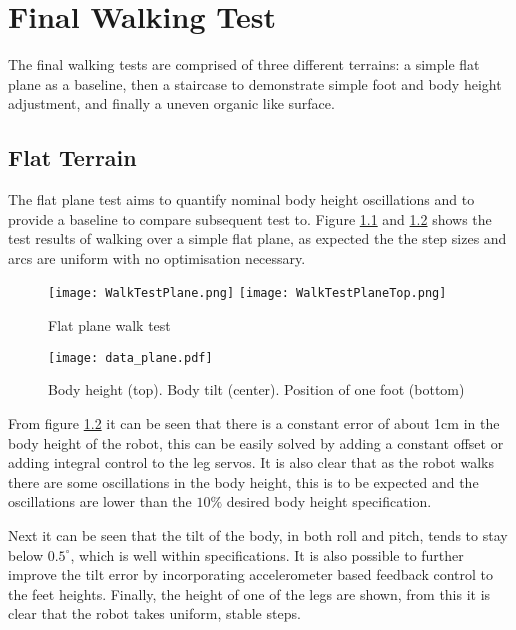 \chapter{Final Walking Test}
    The final walking tests are comprised of three different terrains: a simple flat plane as a baseline, then a staircase to demonstrate simple foot and body height adjustment, and finally a uneven organic like surface.
    

    \section{Flat Terrain}
    The flat plane test aims to quantify nominal body height oscillations and to provide a baseline to compare subsequent test to. Figure \ref{fig:plane_test} and \ref{fig:plane_test_data} shows the test results of walking over a simple flat plane, as expected the the step sizes and arcs are uniform with no optimisation necessary.
    \begin{figure}[h]
        \centering
        \texttt{[image: WalkTestPlane.png]}
        \texttt{[image: WalkTestPlaneTop.png]}
        \caption{Flat plane walk test}
        \label{fig:plane_test}
    \end{figure}
    \begin{figure}[h]
        \centering
        \texttt{[image: data\_plane.pdf]}
        \caption{Body height (top). Body tilt (center). Position of one foot (bottom)}
        \label{fig:plane_test_data}
    \end{figure}
    
    \noindent
    From figure \ref{fig:plane_test_data} it can be seen that there is a constant error of about 1cm in the body height of the robot, this can be easily solved by adding a constant offset or adding integral 
    control to the leg servos. It is also clear that as the robot walks there are some oscillations in the body height, this is to be expected and the oscillations are lower than the \(10\%\) desired body height specification.
        
    Next it can be seen that the tilt of the body, in both roll and pitch, tends to stay below \(0.5^\circ\), which is well within specifications. It is also possible to further improve
    the tilt error by incorporating accelerometer based feedback control to the feet heights. Finally, the height of one of the legs are shown, from this it is clear that the robot takes
    uniform, stable steps.


